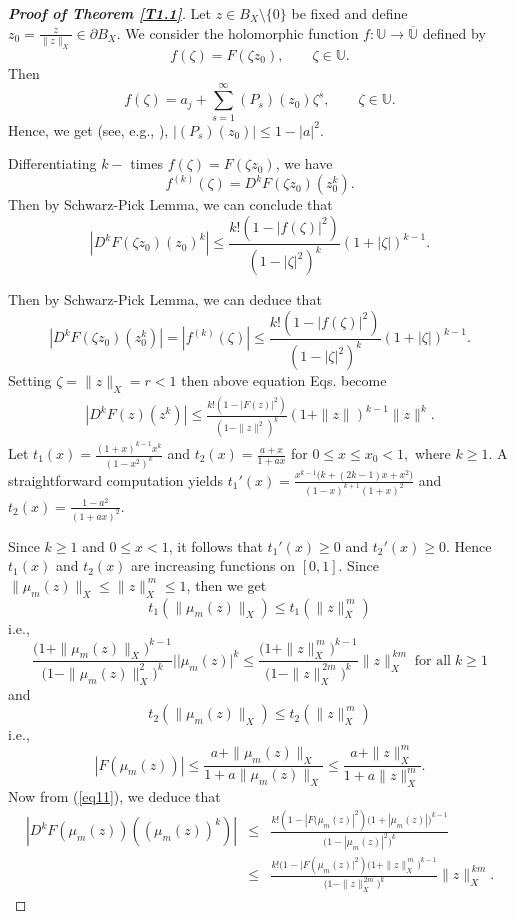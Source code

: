 \documentclass[11pt, reqno]{amsart}
\newtheorem*{cor A}{Corollary A}
\newtheorem*{cor B}{Corollary B}
\newcommand{\bea}{\begin{eqnarray}}
\newcommand{\eea}{\end{eqnarray}}
\numberwithin{equation}{section}
\begin{document}
\begin{proof}[{\bf Proof of Theorem \ref{T1.1}}]
Let $z\in B_X\setminus\{0\}$ be fixed and define $z_0=\frac{z}{\|z\|_X}\in \partial B_X.$
We consider the holomorphic function $f: \mathbb{U} \to \overline{\mathbb{U}}$ defined by
\[
f(\zeta) = F(\zeta z_0), \qquad \zeta \in \mathbb{U}.
\]
 Then 
\begin{equation}\label{eq:fexp}
f(\zeta)=a_j+\sum_{s=1}^{\infty}(P_s)(z_0)\zeta^s,
\qquad \zeta\in\mathbb{U}.
\end{equation}
Hence, we get (see, e.g., \cite[p.~35]{GK2003}),
$|(P_s)(z_0)|\le 1-|a|^2$.

Differentiating $k-$ times  $f(\zeta)= F(\zeta z_0)$, we have 
\[ f^{(k)}(\zeta)=D^k F(\zeta z_0) (z_0^k).\]
Then by Schwarz-Pick Lemma, we can conclude that 
\[ |D^kF(\zeta z_0)(z_0)^k|\leq \frac{k!(1-|f(\zeta)|^2)}{(1-|\zeta|^2)^k}(1+|\zeta|)^{k-1}.\]

Then by Schwarz-Pick Lemma, we can deduce that
\[ |D^kF(\zeta z_0)(z_0^k)|=|f^{(k)}(\zeta)|\leq \frac{k!(1-|f(\zeta)|^2)}{(1-|\zeta|^2)^k}(1+|\zeta|)^{k-1}.\]
Setting $\zeta=\|z\|_X=r<1$ then above equation Eqs. become 
\bea\label{eq11} |D^kF(z) (z^k)|\leq \frac{k!(1-|F(z)|^2)}{(1-\|z\|^2)^k}(1+\|z\|)^{k-1}\|z\|^k.\eea
Let $t_1(x)=\frac{(1+x)^{k-1}x^k}{(1-x^2)^k}$  and $t_2(x)=\frac{a+x}{1+ax}$ for  $0\le x\le x_0<1,$ where $k\ge 1$. A straightforward computation yields $t_1'(x)=\frac{x^{k-1}\bigl(k+(2k-1)x+x^2\bigr)}{(1-x)^{k+1}(1+x)^2}$ and $ t_2(x)=\frac{1-a^2}{(1+ax)^2}$.


Since $k\ge 1$ and $0\le x<1$, it follows that $t_1'(x)\ge 0$ and $t_2'(x)\geq 0$.
Hence $t_1(x)$ and $t_2(x)$ are  increasing functions on $[0,1]$. Since $\|\mu_m(z)\|_X\le \|z\|_X^{\,m}\leq 1$, then we get 
\[t_1(\|\mu_m(z)\|_X)\leq t_1(\|z\|_X^{\,m})\]
i.e., 
\[
\frac{\bigl(1+\|\mu_m(z)\|_X\bigr)^{k-1}}
     {\bigl(1-\|\mu_m(z)\|_X^2\bigr)^k}||\mu_m(z)|^k
\le
\frac{\bigl(1+\|z\|_X^{\,m}\bigr)^{k-1}}
     {\bigl(1-\|z\|_X^{\,2m}\bigr)^k}\|z\|_X^{\,km}\;\text{for all}\;k\geq 1
\]
and 
\[t_2(\|\mu_m(z)\|_X)\leq t_2(\|z\|_X^{\,m}) \]
i.e., 
\[|F(\mu_m(z))|\leq \frac{a+\|\mu_m(z)\|_X}{1+a\|\mu_m(z)\|_X}\leq \frac{a+\|z\|_X^m}{1+a\|z\|_X^m}.\]
Now from (\ref{eq11}), we deduce that 
\bea\label{eq12}|D^kF(\mu_m(z)) ((\mu_m(z))^k)|&\leq&  \frac{k!(1-|F(\mu_m(z)|^2)\bigl(1+|\mu_m(z)|\bigr)^{k-1}}{\bigl(1-|\mu_m(z)|^2\bigr)^k}\nonumber\\
&\leq& \frac{k!(1-|F(\mu_m(z)|^2)\bigl(1+\|z\|_X^{\,m}\bigr)^{k-1}}{\bigl(1-\|z\|_X^{\,2m}\bigr)^k}\|z\|_X^{\,km}.\eea


\end{proof}
\end{document}
